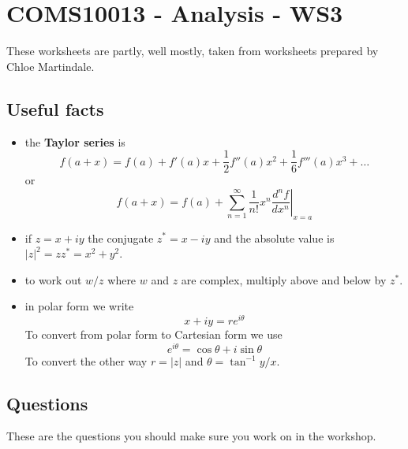 \documentclass[11pt,a4paper]{scrartcl}
\begin{document}
\section*{COMS10013 - Analysis - WS3}

These worksheets are partly, well mostly, taken from worksheets prepared by Chloe Martindale.

\subsection*{Useful facts}

\begin{itemize}
\item the \textbf{Taylor series} is
  $$f(a+x)=f(a)+f'(a)x+\frac{1}{2}f''(a)x^2+\frac{1}{6}f'''(a)x^3+\ldots$$
  or
  $$f(a+x)=f(a)+\sum_{n=1}^\infty \frac{1}{n!}x^n\left.\frac{d^nf}{dx^n}\right|_{x=a}$$
\item if $z=x+iy$ the conjugate $z^*=x-iy$ and the absolute value is $|z|^2=zz^*=x^2+y^2$.
\item to work out $w/z$ where $w$ and $z$ are complex, multiply above and below by $z^*$.
\item in polar form we write
  \begin{equation}
    x+iy=re^{i\theta}
  \end{equation}
  To convert from polar form to Cartesian form we use
  \begin{equation}
    e^{i\theta}=\cos{\theta}+i\sin{\theta}
  \end{equation}
  To convert the other way $r=|z|$ and $\theta=\tan^{-1}y/x$.

  


\end{itemize}


\subsection*{Questions}

These are the questions you should make sure you work on in the workshop.
\end{document}

